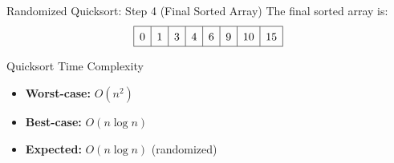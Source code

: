 \begin{frame}{Randomized Quicksort: Step 4 (Final Sorted Array)}
  The final sorted array is:
  \[
    \renewcommand{\arraystretch}{1.5}
    \begin{array}{|c|c|c|c|c|c|c|c|}
      \hline
      0 & 1 & 3 & 4 & 6 & 9 & 10 & 15 \\
      \hline
    \end{array}
  \]
\end{frame}

\begin{frame}{Quicksort Time Complexity}
  \begin{itemize}
    \item \textbf{Worst-case:} $O(n^2)$
    \item \textbf{Best-case:} $O(n \log n)$
    \item \textbf{Expected:} $O(n \log n)$ (randomized)
  \end{itemize}
\end{frame}

